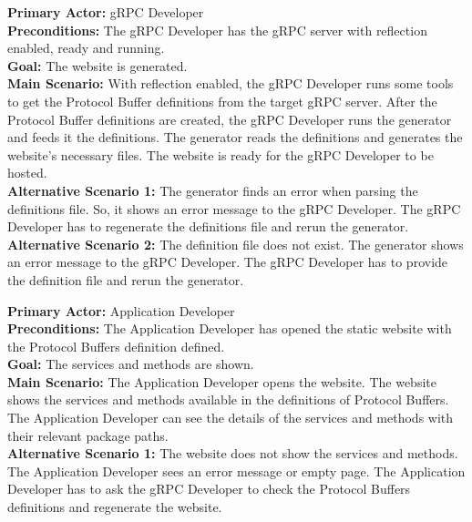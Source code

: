 
\textbf{Primary Actor:} gRPC Developer\\
\textbf{Preconditions:} The gRPC Developer has the gRPC server with reflection enabled, ready and running.\\
\textbf{Goal:} The website is generated.\\
\textbf{Main Scenario:}
With reflection enabled, the gRPC Developer runs some tools to get the Protocol Buffer definitions from the target gRPC server.
After the Protocol Buffer definitions are created, the gRPC Developer runs the generator and feeds it the definitions.
The generator reads the definitions and generates the website's necessary files.
The website is ready for the gRPC Developer to be hosted.\\
\textbf{Alternative Scenario 1:}
The generator finds an error when parsing the definitions file.
So, it shows an error message to the gRPC Developer.
The gRPC Developer has to regenerate the definitions file and rerun the generator.\\
\textbf{Alternative Scenario 2:}
The definition file does not exist.
The generator shows an error message to the gRPC Developer.
The gRPC Developer has to provide the definition file and rerun the generator.



\textbf{Primary Actor:} Application Developer\\
\textbf{Preconditions:} The Application Developer has opened the static website with the Protocol Buffers definition defined.\\
\textbf{Goal:} The services and methods are shown.\\
\textbf{Main Scenario:}
The Application Developer opens the website.
The website shows the services and methods available in the definitions of Protocol Buffers.
The Application Developer can see the details of the services and methods with their relevant package paths.\\
\textbf{Alternative Scenario 1:}
The website does not show the services and methods.
The Application Developer sees an error message or empty page.
The Application Developer has to ask the gRPC Developer to check the Protocol Buffers definitions and regenerate the website.


